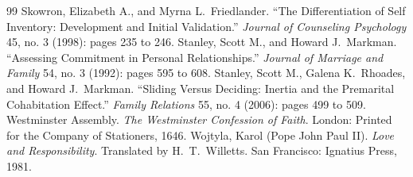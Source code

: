 \documentclass[11pt,twocolumn]{article}
\begin{document}
\begin{thebibliography}{99}
 Skowron, Elizabeth A., and Myrna L.~Friedlander. ``The Differentiation of Self Inventory: Development and Initial Validation.'' \textit{Journal of Counseling Psychology} 45, no. 3 (1998): pages 235 to 246.
 Stanley, Scott M., and Howard J.~Markman. ``Assessing Commitment in Personal Relationships.'' \textit{Journal of Marriage and Family} 54, no. 3 (1992): pages 595 to 608.
 Stanley, Scott M., Galena K.~Rhoades, and Howard J.~Markman. ``Sliding Versus Deciding: Inertia and the Premarital Cohabitation Effect.'' \textit{Family Relations} 55, no. 4 (2006): pages 499 to 509.
 Westminster Assembly. \textit{The Westminster Confession of Faith}. London: Printed for the Company of Stationers, 1646.
 Wojtyla, Karol (Pope John Paul II). \textit{Love and Responsibility}. Translated by H.~T.~Willetts. San Francisco: Ignatius Press, 1981.
\end{thebibliography}
\end{document}
